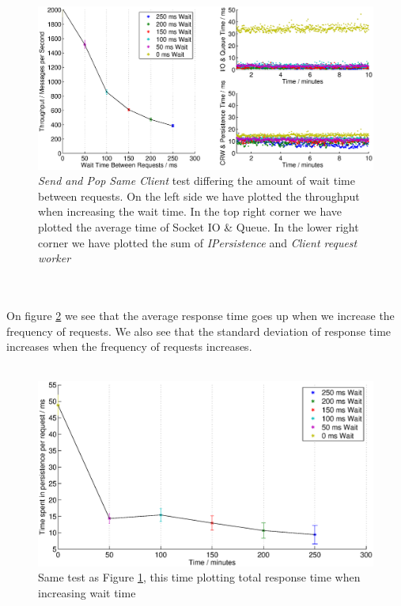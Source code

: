 \documentclass{article}
\begin{document}
             \begin{figure}[H]
                    \centering
                    \includegraphics[scale=0.65]{sleep_time_between_requests_100clients_30_30}
                    \caption{\textit{Send and Pop Same Client} test differing the amount of wait time between requests. On the left side we have plotted the throughput when increasing the wait time. In the top right corner we have plotted the average time of Socket IO \& Queue. In the lower right corner we have plotted the sum of \textit{IPersistence} and \textit{Client request worker}}
                    \label{fig:sleep_time_between_requests_100clients_30_30}
             \end{figure}
             ~\\
             \\
             On figure \ref{fig:sleep_time_between_requests_respTime_100clients_30_30} we see that the average response time goes up when we increase the frequency of requests. We also see that the standard deviation of response time increases when the frequency of requests increases.\\
             \\
              \begin{figure}[H]
                      \centering
                      \includegraphics[scale=0.60]{sleep_time_between_requests_respTime_100clients_30_30}
                      \caption{Same test as Figure \ref{fig:sleep_time_between_requests_100clients_30_30}, this time plotting total response time when increasing wait time}
                      \label{fig:sleep_time_between_requests_respTime_100clients_30_30}
              \end{figure}
\end{document}
